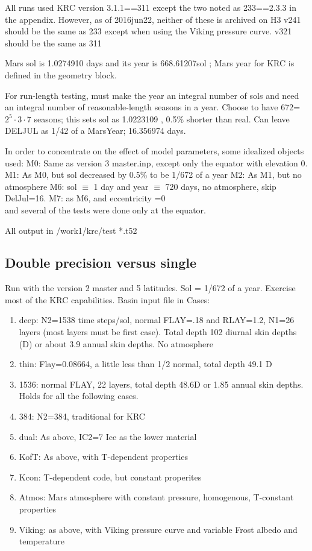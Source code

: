 \documentclass{article}  %
\begin{document}
All runs used KRC version 3.1.1==311 except the two noted as 233==2.3.3 in the appendix. However, as of 2016jun22, neither of these is archived on H3
\qi v241 should be the same as 233 except when using the Viking pressure curve.
\qi v321 should be the same as 311 

Mars sol is 1.0274910 days and its year is 668.61207sol ; Mars year for KRC is defined in the geometry block.

For run-length testing, must make the year an integral number of sols and need an integral number of reasonable-length seasons in a year. Choose to have 672=$2^5 \cdot 3 \cdot 7 $ seasons; this sets sol as 1.0223109 , 0.5\% shorter than real.
Can leave DELJUL as 1/42 of a MarsYear; 16.356974 days.
 
In order to concentrate on the effect of model parameters, some idealized objects used:
\qi M0: Same as version 3 master.inp, except only the equator with elevation 0.
\qi M1: As M0, but sol decreased by 0.5\% to be 1/672 of a year
\qi M2: As M1, but no atmosphere
\qi M6: sol $\equiv$ 1 day and year $\equiv$ 720 days, no atmosphere, skip DelJul=16. 
\qi M7: as M6, and  eccentricity =0
\\ and several of the tests were done only at the equator.

All output in /work1/krc/test *.t52

\subsection{Double precision versus single \label{dp} } %

Run with the version 2 master and 5 latitudes. Sol = 1/672 of a year. Exercise most of the KRC capabilities.  Basin input file in  Cases:
\begin{enumerate}    %
 \item deep: N2=1538 time steps/sol, normal FLAY=.18 and RLAY=1.2, N1=26 layers (most layers must be first case). Total depth 102 diurnal skin depths (D) or about 3.9 annual skin depths.   No atmosphere
\item thin: Flay=0.08664, a little less than 1/2 normal, total depth 49.1 D
\item 1536: normal FLAY, 22 layers, total depth 48.6D or 1.85 annual skin depths.
\qii  Holds for all the following cases. 
\item  384: N2=384, traditional for KRC
\item  dual: As above, IC2=7  Ice as the lower material
\item KofT:  As above, with T-dependent properties
\item Kcon:  T-dependent code, but constant properites
\item Atmos: Mars atmosphere with constant pressure, homogenous, T-constant properties
\item Viking: as above, with Viking pressure curve and variable Frost albedo and temperature
\end{enumerate}
\end{document}
